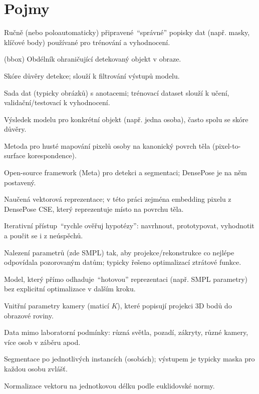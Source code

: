 \documentclass[11pt,a4paper,twoside,openright]{report}
\begin{document}
\section*{Pojmy}
\begin{description}[style=nextline]
    \item[anotace] Ručně (nebo poloautomaticky) připravené \,\enquote{správné} popisky dat (např. masky, klíčové body) používané pro trénování a vyhodnocení.
    \item[bounding box] (bbox) Obdélník ohraničující detekovaný objekt v obraze.
    \item[confidence] Skóre důvěry detekce; slouží k filtrování výstupů modelu.
    \item[dataset] Sada dat (typicky obrázků) s anotacemi; trénovací dataset slouží k učení, validační/testovací k vyhodnocení.
    \item[detekce] Výsledek modelu pro konkrétní objekt (např. jedna osoba), často spolu se skóre důvěry.
    \item[DensePose] Metoda pro husté mapování pixelů osoby na kanonický povrch těla (pixel-to-surface korespondence).
    \item[Detectron2] Open-source framework (Meta) pro detekci a segmentaci; DensePose je na něm postavený.
    \item[embedding] Naučená vektorová reprezentace; v této práci zejména embedding pixelu z DensePose CSE, který reprezentuje místo na povrchu těla.
    \item[Fail-Fast] Iterativní přístup \,\enquote{rychle ověřuj hypotézy}: navrhnout, prototypovat, vyhodnotit a poučit se i z neúspěchů.
    \item[fitting] Nalezení parametrů (zde SMPL) tak, aby projekce/rekonstrukce co nejlépe odpovídala pozorovaným datům; typicky řešeno optimalizací ztrátové funkce.
    \item[holistický model] Model, který přímo odhaduje \,\enquote{hotovou} reprezentaci (např. SMPL parametry) bez explicitní optimalizace v dalším kroku.
    \item[intrinsics] Vnitřní parametry kamery (maticí $K$), které popisují projekci 3D bodů do obrazové roviny.
    \item[in-the-wild] Data mimo laboratorní podmínky: různá světla, pozadí, zákryty, různé kamery, více osob v záběru apod.
    \item[instance segmentace] Segmentace po jednotlivých instancích (osobách); výstupem je typicky maska pro každou osobu zvlášť.
    \item[L2-normalizace] Normalizace vektoru na jednotkovou délku podle euklidovské normy.

\end{description}
\end{document}

